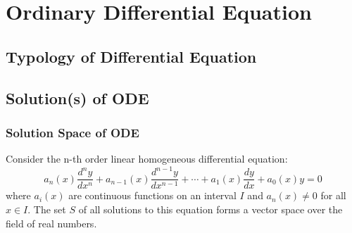 \chapter{Ordinary Differential Equation}

\section{Typology of Differential Equation}

\section{Solution(s) of ODE}

\subsection{Solution Space of ODE}
\begin{theorem}
Consider the n-th order linear homogeneous differential equation:
\[
a_n(x)\frac{d^ny}{dx^n} + a_{n-1}(x)\frac{d^{n-1}y}{dx^{n-1}} + \cdots + a_1(x)\frac{dy}{dx} + a_0(x)y = 0
\]
where $a_i(x)$ are continuous functions on an interval $I$ and $a_n(x) \neq 0$ for all $x \in I$. 
The set $S$ of all solutions to this equation forms a vector space over the field of real numbers.
\end{theorem}


